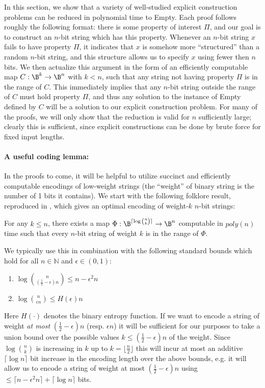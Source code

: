 In this section, we show that a variety of well-studied explicit construction problems can be reduced in polynomial time to {\sc Empty}. Each proof follows roughly the following format: there is some property of interest $\Pi$, and our goal is to construct an $n$-bit string which has this property. Whenever an $n$-bit string $x$ fails to have property $\Pi$, it indicates that $x$ is somehow more ``structured'' than a random $n$-bit string, and this structure allows us to specify $x$ using fewer then $n$ bits. We then actualize this argument in the form of an efficiently computable map $C: \B^k \rightarrow \B^n$ with $k < n$, such that any string not having property $\Pi$ is in the range of $C$. This immediately implies that any $n$-bit string outside the range of $C$ must hold property $\Pi$, and thus any solution to the instance of {\sc Empty} defined by $C$ will be a solution to our explicit construction problem. For many of the proofs, we will only show that the reduction is valid for $n$ sufficiently large; clearly this is sufficient, since explicit constructions can be done by brute force for fixed input lengths.

\paragraph{A useful coding lemma:} In the proofs to come, it will be helpful to utilize succinct and efficiently computable encodings of low-weight strings (the ``weight'' of binary string is the number of 1 bits it contains). We start with the following folklore result, reproduced in \cite{Coin-Problem}, which gives an optimal encoding of weight-$k$ $n$-bit strings:

\begin{lemma}\label{lem:sparse-enc}\cite{Coin-Problem}
For any $k \leq n$, there exists a map $\Phi: \B^{\lceil \log\binom{n}{k}\rceil } \rightarrow \B^n$ computable in $poly(n)$ time such that every $n$-bit string of weight $k$ is in the range of $\Phi$.
\end{lemma}

We typically use this in combination with the following standard bounds which hold for all $n \in \mathbb{N}$ and $\epsilon \in (0,1)$:
\begin{enumerate}
    \item $\log\binom{n}{(\frac{1}{2}-\epsilon)n} \leq n - \epsilon^2n$
    \item $\log \binom{n}{\epsilon n} \leq H(\epsilon)n$
\end{enumerate}
Here $H(\cdot)$ denotes the binary entropy function. If we want to encode a string of weight \emph{at most} $(\frac{1}{2}-\epsilon)n$ (resp. $\epsilon n$) it will be sufficient for our purposes to take a union bound over the possible values $k \leq (\frac{1}{2}-\epsilon)n$ of the weight. Since $\log\binom{n}{k}$ is increasing in $k$ up to $k = \lfloor \frac{n}{2} \rfloor$ this will incur at most an additive $\lceil \log n \rceil$ bit increase in the encoding length over the above bounds, e.g. it will allow us to encode a string of weight at most $(\frac{1}{2}-\epsilon)n$ using $\leq \lceil n - \epsilon^2n \rceil + \lceil \log n \rceil$ bits.

